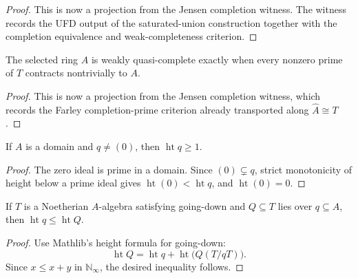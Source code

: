 \begin{proof}
  This is now a projection from the Jensen completion witness.  The witness
  records the UFD output of the saturated-union construction together with the
  completion equivalence and weak-completeness criterion.
\end{proof}

\begin{lemma}
  \label{lem:counterexample_weak_criterion_source}
  The selected ring \(A\) is weakly quasi-complete exactly when every nonzero
  prime of \(T\) contracts nontrivially to \(A\).
\end{lemma}

\begin{proof}
  This is now a projection from the Jensen completion witness, which records
  the Farley completion-prime criterion already transported along
  \(\widehat A\cong T\).
\end{proof}

\begin{lemma}
  \label{lem:nonzero_prime_height_ge_one_source}
  If \(A\) is a domain and \(q\neq(0)\), then \(\operatorname{ht}q\geq 1\).
\end{lemma}

\begin{proof}
  The zero ideal is prime in a domain.  Since \((0)\subsetneq q\), strict
  monotonicity of height below a prime ideal gives
  \(\operatorname{ht}(0)<\operatorname{ht}q\), and
  \(\operatorname{ht}(0)=0\).
\end{proof}

\begin{lemma}
  \label{lem:lies_over_height_le_of_has_going_down_source}
  If \(T\) is a Noetherian \(A\)-algebra satisfying going-down and
  \(Q\subseteq T\) lies over \(q\subseteq A\), then
  \(\operatorname{ht}q\leq\operatorname{ht}Q\).
\end{lemma}

\begin{proof}
  Use Mathlib's height formula for going-down:
  \[
    \operatorname{ht}Q =
    \operatorname{ht}q +
    \operatorname{ht}\bigl(Q(T/qT)\bigr).
  \]
  Since \(x\leq x+y\) in \(\mathbb N_\infty\), the desired inequality follows.
\end{proof}

